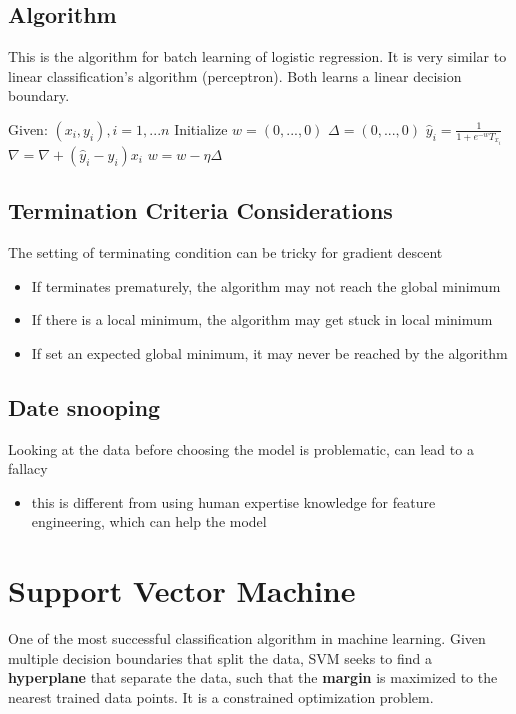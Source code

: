 \documentclass[11pt]{article}
\begin{document}
\subsection{Algorithm}
\label{sec:org900b94d}
This is the algorithm for batch learning of logistic regression. It is very similar to linear classification's algorithm (perceptron). Both learns a linear decision boundary.
\begin{algorithmic}
\State Given: $(x_i, y_i), i = 1,...n$
\State Initialize $w = (0,...,0)$
\Repeat
  \State $\Delta = (0,...,0)$
    \State $\hat { y } _ { i } = \frac { 1} { 1+ e ^ { - w } T _ { x _ { i } } } $
    \State $\nabla = \nabla + \left( \hat { y } _ { i } - y _ { i } \right) x _ { i } $
  \EndFor  
  \State $w = w - \eta \Delta $
\Until{$|\Delta|\leq \epsilon$}
\end{algorithmic}

\subsection{Termination Criteria Considerations}
\label{sec:orgc2aed30}
The setting of terminating condition can be tricky for gradient descent
\begin{itemize}
\item If terminates prematurely, the algorithm may not reach the global minimum
\item If there is a local minimum, the algorithm may get stuck in local minimum
\item If set an expected global minimum, it may never be reached by the algorithm
\end{itemize}

\subsection{Date snooping}
\label{sec:org2a2f0ba}
Looking at the data before choosing the model is problematic, can lead to a fallacy 
\begin{itemize}
\item this is different from using human expertise knowledge for feature engineering, which can help the model
\end{itemize}

\section{Support Vector Machine}
\label{sec:org762e739}
One of the most successful classification algorithm in machine learning. Given multiple decision boundaries that split the data, SVM seeks to find a \textbf{\textbf{hyperplane}} that separate the data, such that the \textbf{\textbf{margin}} is maximized to the nearest trained data points. It is a constrained optimization problem.
\end{document}
